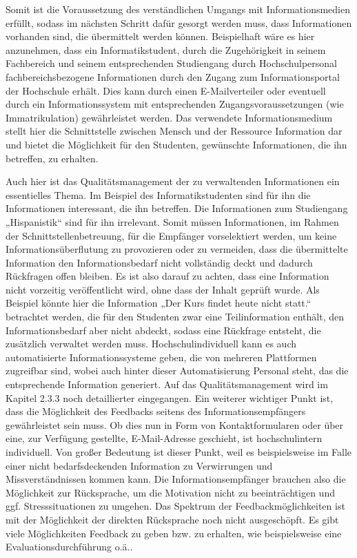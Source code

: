 Somit ist die Voraussetzung des verständlichen Umgangs mit Informationsmedien erfüllt, sodass im nächsten Schritt dafür gesorgt werden muss, dass Informationen vorhanden sind, die übermittelt werden können. Beispielhaft wäre es hier anzunehmen, dass ein Informatikstudent, durch die Zugehörigkeit in seinem Fachbereich und seinem entsprechenden Studiengang durch Hochschulpersonal fachbereichsbezogene Informationen durch den Zugang zum Informationsportal der Hochschule erhält. Dies kann durch einen E-Mailverteiler oder eventuell durch ein Informationssystem mit entsprechenden Zugangsvoraussetzungen (wie Immatrikulation) gewährleistet werden. Das verwendete Informationsmedium stellt hier die Schnittstelle zwischen Mensch und der Ressource Information dar und bietet die Möglichkeit für den Studenten, gewünschte Informationen, die ihn betreffen, zu erhalten.

Auch hier ist das Qualitätsmanagement der zu verwaltenden Informationen ein essentielles Thema. Im Beispiel des Informatikstudenten sind für ihn die Informationen interessant, die ihn betreffen. Die Informationen zum Studiengang „Hispanistik“ sind für ihn irrelevant. Somit müssen Informationen, im Rahmen der Schnittstellenbetreuung, für die Empfänger vorselektiert werden, um keine Informationsüberflutung zu provozieren oder zu vermeiden, dass die übermittelte Information den Informationsbedarf nicht vollständig deckt und dadurch Rückfragen offen bleiben. Es ist also darauf zu achten, dass eine Information nicht vorzeitig veröffentlicht wird, ohne dass der Inhalt geprüft wurde. Als Beispiel könnte hier die Information „Der Kurs findet heute nicht statt.“ betrachtet werden, die für den Studenten zwar eine Teilinformation enthält, den Informationsbedarf aber nicht abdeckt, sodass eine Rückfrage entsteht, die zusätzlich verwaltet werden muss. Hochschulindividuell kann es auch automatisierte Informationssysteme geben, die von mehreren Plattformen zugreifbar sind, wobei auch hinter dieser Automatisierung Personal steht, das die entsprechende Information generiert. Auf das Qualitätsmanagement wird im Kapitel 2.3.3 noch detaillierter eingegangen.
Ein weiterer wichtiger Punkt ist, dass die Möglichkeit des Feedbacks seitens des Informationsempfängers gewährleistet sein muss. Ob dies nun in Form von Kontaktformularen oder über eine, zur Verfügung gestellte, E-Mail-Adresse geschieht, ist hochschulintern individuell. Von großer Bedeutung ist dieser Punkt, weil es beispielsweise im Falle einer nicht bedarfsdeckenden Information zu Verwirrungen und Missverständnissen kommen kann. Die Informationsempfänger brauchen also die Möglichkeit zur Rücksprache, um die Motivation nicht zu beeinträchtigen und ggf. Stresssituationen zu umgehen. 
Das Spektrum der Feedbackmöglichkeiten ist mit der Möglichkeit der direkten Rücksprache noch nicht ausgeschöpft. Es gibt viele Möglichkeiten Feedback zu geben bzw. zu erhalten, wie beispielsweise eine Evaluationsdurchführung o.ä..
